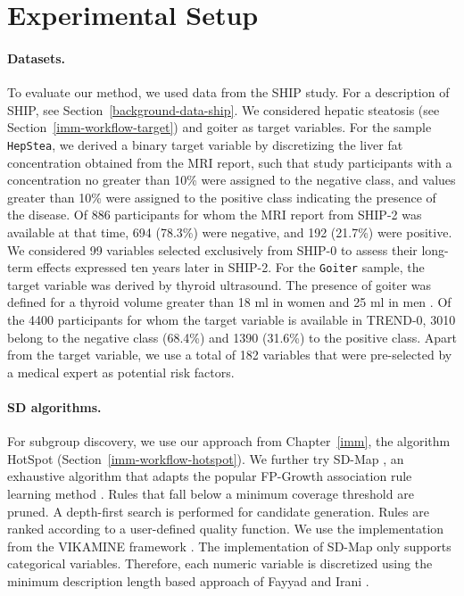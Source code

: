 \documentclass[
  oneside]{book}
\begin{document}
\hypertarget{sdclu-experiments}{%
\section{Experimental Setup}\label{sdclu-experiments}}

\paragraph*{Datasets.}

To evaluate our method, we used data from the SHIP study.
For a description of SHIP, see Section~\ref{background-data-ship}.
We considered hepatic steatosis (see Section~\ref{imm-workflow-target}) and goiter as target variables.
For the sample \texttt{HepStea}, we derived a binary target variable by discretizing the liver fat concentration obtained from the MRI report, such that study participants with a concentration no greater than 10\% were assigned to the negative class, and values greater than 10\% were assigned to the positive class indicating the presence of the disease.
Of 886 participants for whom the MRI report from SHIP-2 was available at that time, 694 (78.3\%) were negative, and 192 (21.7\%) were positive.
We considered 99 variables selected exclusively from SHIP-0 to assess their long-term effects expressed ten years later in SHIP-2.
For the \texttt{Goiter} sample, the target variable was derived by thyroid ultrasound.
The presence of goiter was defined for a thyroid volume greater than 18 ml in women and 25 ml in men \autocite{Gutekunst:88}.
Of the 4400 participants for whom the target variable is available in TREND-0, 3010 belong to the negative class (68.4\%) and 1390 (31.6\%) to the positive class.
Apart from the target variable, we use a total of 182 variables that were pre-selected by a medical expert as potential risk factors.

\paragraph*{SD algorithms.}

For subgroup discovery, we use our approach from Chapter~\ref{imm}, the algorithm HotSpot \autocite{Hall:Weka09} (Section~\ref{imm-workflow-hotspot}).
We further try SD-Map \autocite{Atzmueller:SD-Map:06}, an exhaustive algorithm that adapts the popular FP-Growth association rule learning method \autocite{Han:FPGrowth00}.
Rules that fall below a minimum coverage threshold are pruned.
A depth-first search is performed for candidate generation.
Rules are ranked according to a user-defined quality function.
We use the implementation from the VIKAMINE framework \autocite{Atzmueller:VIKAMINE12}.
The implementation of SD-Map only supports categorical variables.
Therefore, each numeric variable is discretized using the minimum description length based approach of Fayyad and Irani \autocite{Fayyad:MDL93}.
\end{document}
